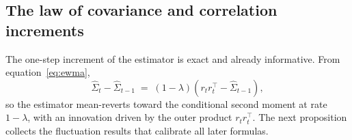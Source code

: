 \documentclass{rQUF2e}
\theoremstyle{plain}
\theoremstyle{remark}
\begin{document}
\subsection{The law of covariance and correlation increments}
\label{sec:increments}

The one-step increment of the estimator is exact and already informative. From
equation~\eqref{eq:ewma},
\begin{equation}
\widehat{\Sigma}_t - \widehat{\Sigma}_{t-1}
\;=\; (1-\lambda)\left( r_t r_t^{\top} - \widehat{\Sigma}_{t-1} \right),
\label{eq:increment}
\end{equation}
so the estimator mean-reverts toward the conditional second moment at rate
$1-\lambda$, with an innovation driven by the outer product $r_t r_t^{\top}$.
The next proposition collects the fluctuation results that calibrate all later
formulas.
\end{document}

